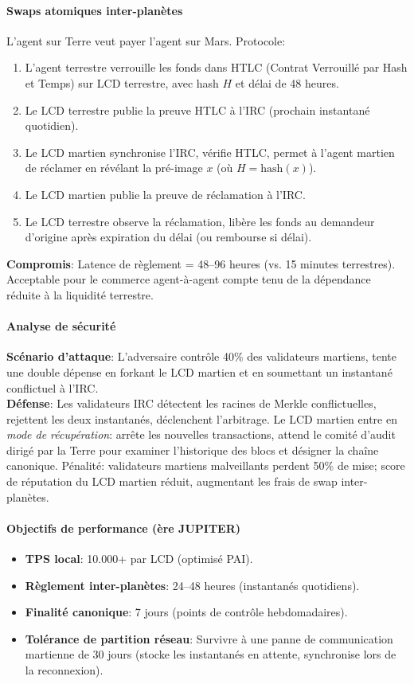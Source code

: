 \documentclass[11pt]{article}
\begin{document}
\paragraph{Swaps atomiques inter-planètes}
L'agent sur Terre veut payer l'agent sur Mars. Protocole:
\begin{enumerate}[noitemsep]
  \item L'agent terrestre verrouille les fonds dans HTLC (Contrat Verrouillé par Hash et Temps) sur LCD terrestre, avec hash $H$ et délai de 48 heures.
  \item Le LCD terrestre publie la preuve HTLC à l'IRC (prochain instantané quotidien).
  \item Le LCD martien synchronise l'IRC, vérifie HTLC, permet à l'agent martien de réclamer en révélant la pré-image $x$ (où $H = \text{hash}(x)$).
  \item Le LCD martien publie la preuve de réclamation à l'IRC.
  \item Le LCD terrestre observe la réclamation, libère les fonds au demandeur d'origine après expiration du délai (ou rembourse si délai).
\end{enumerate}
\textbf{Compromis}: Latence de règlement = 48--96 heures (vs. 15 minutes terrestres). Acceptable pour le commerce agent-à-agent compte tenu de la dépendance réduite à la liquidité terrestre.

\paragraph{Analyse de sécurité}
\textbf{Scénario d'attaque}: L'adversaire contrôle 40\% des validateurs martiens, tente une double dépense en forkant le LCD martien et en soumettant un instantané conflictuel à l'IRC.\\
\textbf{Défense}: Les validateurs IRC détectent les racines de Merkle conflictuelles, rejettent les deux instantanés, déclenchent l'arbitrage. Le LCD martien entre en \emph{mode de récupération}: arrête les nouvelles transactions, attend le comité d'audit dirigé par la Terre pour examiner l'historique des blocs et désigner la chaîne canonique. Pénalité: validateurs martiens malveillants perdent 50\% de mise; score de réputation du LCD martien réduit, augmentant les frais de swap inter-planètes.

\paragraph{Objectifs de performance (ère JUPITER)}
\begin{itemize}[noitemsep]
  \item \textbf{TPS local}: 10.000+ par LCD (optimisé PAI).
  \item \textbf{Règlement inter-planètes}: 24--48 heures (instantanés quotidiens).
  \item \textbf{Finalité canonique}: 7 jours (points de contrôle hebdomadaires).
  \item \textbf{Tolérance de partition réseau}: Survivre à une panne de communication martienne de 30 jours (stocke les instantanés en attente, synchronise lors de la reconnexion).
\end{itemize}
\end{document}
